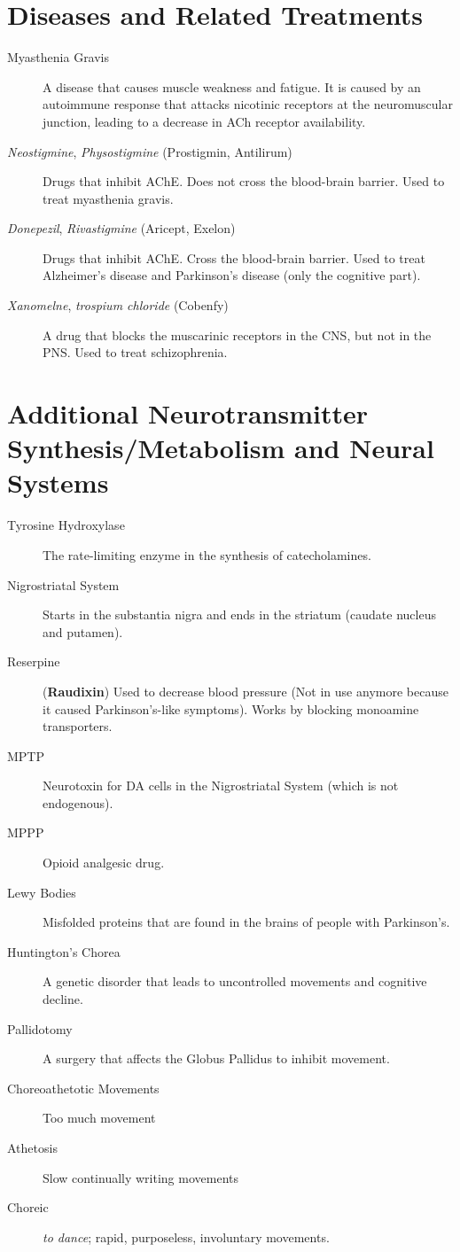 \section*{Diseases and Related Treatments}
\begin{description}
    \item[Myasthenia Gravis] A disease that causes muscle weakness and fatigue. It is caused by an autoimmune response that attacks nicotinic receptors at the neuromuscular junction, leading to a decrease in ACh receptor availability. 
    \item[\textit{Neostigmine}, \textit{Physostigmine} (Prostigmin, Antilirum)] Drugs that inhibit AChE. Does not cross the blood-brain barrier. Used to treat myasthenia gravis.
    \item[\textit{Donepezil}, \textit{Rivastigmine} (Aricept, Exelon)] Drugs that inhibit AChE. Cross the blood-brain barrier. Used to treat Alzheimer's disease and Parkinson's disease (only the cognitive part).
    \item[\textit{Xanomelne}, \textit{trospium chloride} (Cobenfy)] A drug that blocks the muscarinic receptors in the CNS, but not in the PNS. Used to treat schizophrenia.
\end{description}

\section*{Additional Neurotransmitter Synthesis/Metabolism and Neural Systems}
\begin{description}
    \item[Tyrosine Hydroxylase] The rate-limiting enzyme in the synthesis of catecholamines.
    \item[Nigrostriatal System] Starts in the substantia nigra and ends in the striatum (caudate nucleus and putamen).
    \item[Reserpine] (\textbf{Raudixin}) Used to decrease blood pressure (Not in use anymore because it caused Parkinson's-like symptoms). Works by blocking monoamine transporters.
    \item[MPTP] Neurotoxin for DA cells in the Nigrostriatal System (which is not endogenous).
    \item[MPPP] Opioid analgesic drug.
    \item[Lewy Bodies] Misfolded proteins that are found in the brains of people with Parkinson's.
    \item[Huntington's Chorea] A genetic disorder that leads to uncontrolled movements and cognitive decline.
    \item[Pallidotomy] A surgery that affects the Globus Pallidus to inhibit movement.
    \item[Choreoathetotic Movements] Too much movement
    \item[Athetosis] Slow continually writing movements
    \item[Choreic] \textit{to dance}; rapid, purposeless, involuntary movements.
\end{description}

